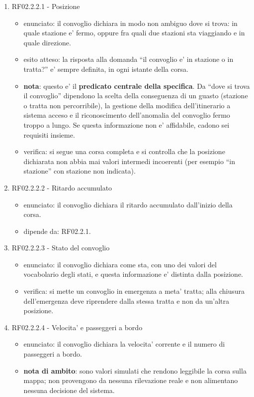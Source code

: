 \documentclass[11pt]{article}
\begin{document}
\begin{enumerate}
\item RF02.2.2.1 - Posizione
\label{sec:org63cbf59}
\begin{itemize}
\item enunciato: il convoglio dichiara in modo non ambiguo dove si trova: in quale stazione e' fermo,
oppure fra quali due stazioni sta viaggiando e in quale direzione.
\item esito atteso: la risposta alla domanda ``il convoglio e' in stazione o in tratta?'' e' sempre
definita, in ogni istante della corsa.
\item \textbf{nota}: questo e' il \textbf{predicato centrale della specifica}. Da ``dove si trova il convoglio''
dipendono la scelta della conseguenza di un guasto (stazione o tratta non percorribile), la
gestione della modifica dell'itinerario a sistema acceso e il riconoscimento dell'anomalia del
convoglio fermo troppo a lungo. Se questa informazione non e' affidabile, cadono sei requisiti
insieme.
\item verifica: si segue una corsa completa e si controlla che la posizione dichiarata non abbia mai
valori intermedi incoerenti (per esempio ``in stazione'' con stazione non indicata).
\end{itemize}
\item RF02.2.2.2 - Ritardo accumulato
\label{sec:orgfa948c6}
\begin{itemize}
\item enunciato: il convoglio dichiara il ritardo accumulato dall'inizio della corsa.
\item dipende da: RF02.2.1.
\end{itemize}
\item RF02.2.2.3 - Stato del convoglio
\label{sec:org443c774}
\begin{itemize}
\item enunciato: il convoglio dichiara come sta, con uno dei valori del vocabolario degli stati, e questa
informazione e' distinta dalla posizione.
\item verifica: si mette un convoglio in emergenza a meta' tratta; alla chiusura dell'emergenza deve
riprendere dalla stessa tratta e non da un'altra posizione.
\end{itemize}
\item RF02.2.2.4 - Velocita' e passeggeri a bordo
\label{sec:org478bd28}
\begin{itemize}
\item enunciato: il convoglio dichiara la velocita' corrente e il numero di passeggeri a bordo.
\item \textbf{nota di ambito}: sono valori simulati che rendono leggibile la corsa sulla mappa; non provengono
da nessuna rilevazione reale e non alimentano nessuna decisione del sistema.
\end{itemize}
\end{enumerate}
\end{document}
